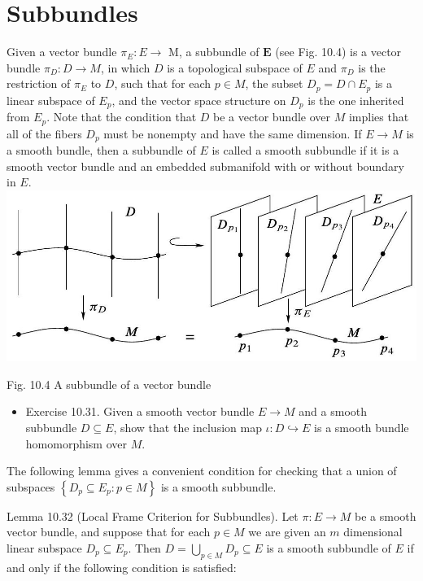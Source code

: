 \documentclass[10pt, letterpaper]{article}
\begin{document}
\section*{Subbundles}
Given a vector bundle $\pi_{E}: E \rightarrow$ M, a subbundle of $\boldsymbol{E}$ (see Fig. 10.4) is a vector bundle $\pi_{D}: D \rightarrow M$, in which $D$ is a topological subspace of $E$ and $\pi_{D}$ is the restriction of $\pi_{E}$ to $D$, such that for each $p \in M$, the subset $D_{p}=D \cap E_{p}$ is a linear subspace of $E_{p}$, and the vector space structure on $D_{p}$ is the one inherited from $E_{p}$. Note that the condition that $D$ be a vector bundle over $M$ implies that all of the fibers $D_{p}$ must be nonempty and have the same dimension. If $E \rightarrow M$ is a smooth bundle, then a subbundle of $E$ is called a smooth subbundle if it is a smooth vector bundle and an embedded submanifold with or without boundary in $E$.\\
\includegraphics[scale=0.2, center]{2025_06_03_90f64b1a1e243cccc2e0g-283}

Fig. 10.4 A subbundle of a vector bundle

\begin{itemize}
  \item Exercise 10.31. Given a smooth vector bundle $E \rightarrow M$ and a smooth subbundle $D \subseteq E$, show that the inclusion map $\iota: D \hookrightarrow E$ is a smooth bundle homomorphism over $M$.
\end{itemize}

The following lemma gives a convenient condition for checking that a union of subspaces $\left\{D_{p} \subseteq E_{p}: p \in M\right\}$ is a smooth subbundle.

Lemma 10.32 (Local Frame Criterion for Subbundles). Let $\pi: E \rightarrow M$ be a smooth vector bundle, and suppose that for each $p \in M$ we are given an $m$ dimensional linear subspace $D_{p} \subseteq E_{p}$. Then $D=\bigcup_{p \in M} D_{p} \subseteq E$ is a smooth subbundle of $E$ if and only if the following condition is satisfied:
\end{document}
